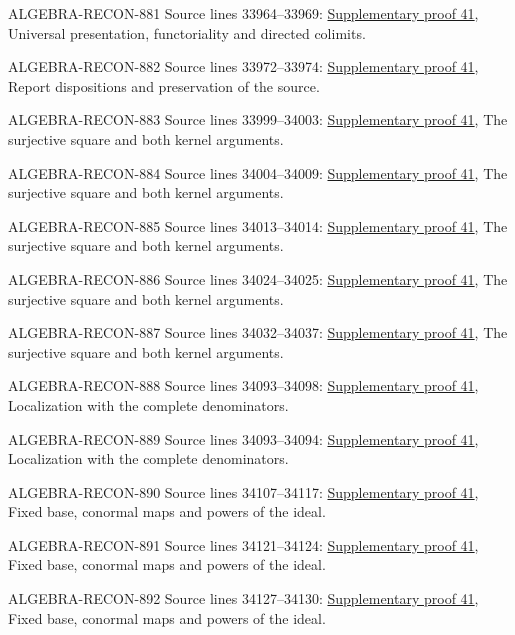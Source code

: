 \begin{AlgebraSourceRoutes}
\item[ALGEBRA-RECON-881] Source lines 33964--33969: \hyperlink{algebra_differentials_notes_20260928}{Supplementary proof 41}, Universal presentation, functoriality and directed colimits.
\item[ALGEBRA-RECON-882] Source lines 33972--33974: \hyperlink{algebra_differentials_notes_20260928}{Supplementary proof 41}, Report dispositions and preservation of the source.
\item[ALGEBRA-RECON-883] Source lines 33999--34003: \hyperlink{algebra_differentials_notes_20260928}{Supplementary proof 41}, The surjective square and both kernel arguments.
\item[ALGEBRA-RECON-884] Source lines 34004--34009: \hyperlink{algebra_differentials_notes_20260928}{Supplementary proof 41}, The surjective square and both kernel arguments.
\item[ALGEBRA-RECON-885] Source lines 34013--34014: \hyperlink{algebra_differentials_notes_20260928}{Supplementary proof 41}, The surjective square and both kernel arguments.
\item[ALGEBRA-RECON-886] Source lines 34024--34025: \hyperlink{algebra_differentials_notes_20260928}{Supplementary proof 41}, The surjective square and both kernel arguments.
\item[ALGEBRA-RECON-887] Source lines 34032--34037: \hyperlink{algebra_differentials_notes_20260928}{Supplementary proof 41}, The surjective square and both kernel arguments.
\item[ALGEBRA-RECON-888] Source lines 34093--34098: \hyperlink{algebra_differentials_notes_20260928}{Supplementary proof 41}, Localization with the complete denominators.
\item[ALGEBRA-RECON-889] Source lines 34093--34094: \hyperlink{algebra_differentials_notes_20260928}{Supplementary proof 41}, Localization with the complete denominators.
\item[ALGEBRA-RECON-890] Source lines 34107--34117: \hyperlink{algebra_differentials_notes_20260928}{Supplementary proof 41}, Fixed base, conormal maps and powers of the ideal.
\item[ALGEBRA-RECON-891] Source lines 34121--34124: \hyperlink{algebra_differentials_notes_20260928}{Supplementary proof 41}, Fixed base, conormal maps and powers of the ideal.
\item[ALGEBRA-RECON-892] Source lines 34127--34130: \hyperlink{algebra_differentials_notes_20260928}{Supplementary proof 41}, Fixed base, conormal maps and powers of the ideal.

\end{AlgebraSourceRoutes}
